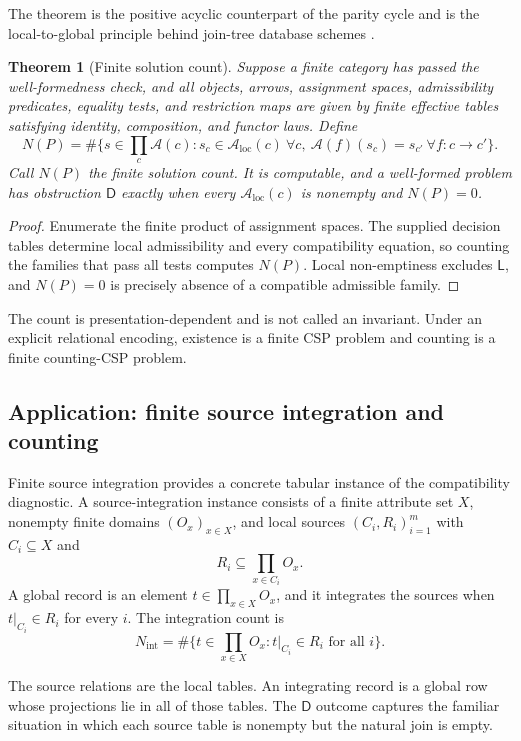 \documentclass[11pt]{article}
\theoremstyle{plain}
\newtheorem{theorem}{Theorem}[section]
\theoremstyle{definition}
\theoremstyle{remark}
\newcommand{\LocalAdm}{\mathcal{A}_{\mathrm{loc}}}
\begin{document}
The theorem is the positive acyclic counterpart of the parity cycle and is the
local-to-global principle behind join-tree database schemes \cite{beerifagin}.

\begin{theorem}[Finite solution count]\label{thm:finite-solution-count}
Suppose a finite category has passed the well-formedness check, and all objects,
arrows, assignment spaces, admissibility predicates, equality tests, and
restriction maps are given by finite effective tables satisfying identity,
composition, and functor laws. Define
\[
N(P)=\#\{s\in\textstyle\prod_c\mathcal A(c):
 s_c\in\LocalAdm(c)\ \forall c,
 \ \mathcal A(f)(s_c)=s_{c'}\ \forall f:c\to c'\}.
\]
Call $N(P)$ the \emph{finite solution count}. It is computable, and a
well-formed problem has obstruction
$\mathsf D$ exactly when every $\LocalAdm(c)$ is nonempty and $N(P)=0$.
\end{theorem}

\begin{proof}
Enumerate the finite product of assignment spaces. The supplied decision tables
determine local admissibility and every compatibility equation, so counting the
families that pass all tests computes $N(P)$. Local non-emptiness excludes
$\mathsf L$, and $N(P)=0$ is precisely absence of a compatible admissible family.
\end{proof}

The count is presentation-dependent and is not called an invariant. Under an
explicit relational encoding, existence is a finite CSP problem and counting is
a finite counting-CSP problem.

\subsection{Application: finite source integration and counting}
\label{subsec:source-integration}

Finite source integration provides a concrete tabular instance of the
compatibility diagnostic. A source-integration instance consists of a finite
attribute set $X$, nonempty finite domains $(O_x)_{x\in X}$, and local sources
$(C_i,R_i)_{i=1}^m$ with $C_i\subseteq X$ and
\[
R_i\subseteq\prod_{x\in C_i}O_x.
\]
A global record is an element $t\in\prod_{x\in X}O_x$, and it integrates the
sources when $t|_{C_i}\in R_i$ for every $i$. The integration count is
\[
N_{\mathrm{int}}=\#\{t\in\prod_{x\in X}O_x:t|_{C_i}\in R_i\text{ for all }i\}.
\]

The source relations are the local tables. An integrating record is a global row
whose projections lie in all of those tables. The $\mathsf D$ outcome captures
the familiar situation in which each source table is nonempty but the natural
join is empty.
\end{document}
